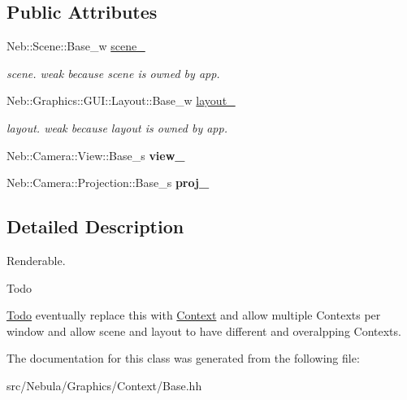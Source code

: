 \subsection*{Public Attributes}
\begin{DoxyCompactItemize}
\item 
\hypertarget{classNeb_1_1Graphics_1_1Context_1_1Base_a4f3f4b08c7a51f9c03340a0ddaeb7ae6}{Neb\-::\-Scene\-::\-Base\-\_\-w \hyperlink{classNeb_1_1Graphics_1_1Context_1_1Base_a4f3f4b08c7a51f9c03340a0ddaeb7ae6}{scene\-\_\-}}\label{classNeb_1_1Graphics_1_1Context_1_1Base_a4f3f4b08c7a51f9c03340a0ddaeb7ae6}

\begin{DoxyCompactList}\small\item\em scene. weak because scene is owned by app. \end{DoxyCompactList}\item 
\hypertarget{classNeb_1_1Graphics_1_1Context_1_1Base_a0f815690b1cb0a9c84706617298512be}{Neb\-::\-Graphics\-::\-G\-U\-I\-::\-Layout\-::\-Base\-\_\-w \hyperlink{classNeb_1_1Graphics_1_1Context_1_1Base_a0f815690b1cb0a9c84706617298512be}{layout\-\_\-}}\label{classNeb_1_1Graphics_1_1Context_1_1Base_a0f815690b1cb0a9c84706617298512be}

\begin{DoxyCompactList}\small\item\em layout. weak because layout is owned by app. \end{DoxyCompactList}\item 
\hypertarget{classNeb_1_1Graphics_1_1Context_1_1Base_af1062621566e1d6e44eb6de4dcd00e58}{Neb\-::\-Camera\-::\-View\-::\-Base\-\_\-s {\bfseries view\-\_\-}}\label{classNeb_1_1Graphics_1_1Context_1_1Base_af1062621566e1d6e44eb6de4dcd00e58}

\item 
\hypertarget{classNeb_1_1Graphics_1_1Context_1_1Base_a4af90873cf044c83e956776bcc7f262c}{Neb\-::\-Camera\-::\-Projection\-::\-Base\-\_\-s {\bfseries proj\-\_\-}}\label{classNeb_1_1Graphics_1_1Context_1_1Base_a4af90873cf044c83e956776bcc7f262c}

\end{DoxyCompactItemize}


\subsection{Detailed Description}
Renderable. 

\begin{DoxyRefDesc}{Todo}
\item[\hyperlink{todo__todo000010}{Todo}]eventually replace this with \hyperlink{namespaceNeb_1_1Graphics_1_1Context}{Context} and allow multiple Contexts per window and allow scene and layout to have different and overalpping Contexts. \end{DoxyRefDesc}


The documentation for this class was generated from the following file\-:\begin{DoxyCompactItemize}
\item 
src/\-Nebula/\-Graphics/\-Context/Base.\-hh\end{DoxyCompactItemize}
